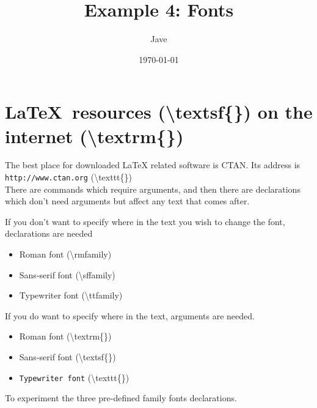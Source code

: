 \documentclass[letterpaper, 12pt]{article}
\begin{document}
\newcommand{\textttEx}{\textbackslash{}texttt\{\}}
\newcommand{\textsfEx}{\textbackslash{}textsf\{\}}
\newcommand{\textrmEx}{\textbackslash{}textrm\{\}}

\newcommand{\rmfamilyEx}{\textbackslash{}rmfamily}
\newcommand{\sffamilyEx}{\textbackslash{}sffamily}
\newcommand{\ttfamilyEx}{\textbackslash{}ttfamily}

\newcommand{\emEx}{\textbackslash{}em}


\newcommand{\mylipsum}{}
\title{Example 4: Fonts}
\date{\today}
\author{Jave}
\maketitle

\section{\textsf{\LaTeX\ resources (\textsfEx) \textrm{on the internet (\textrmEx)} } }

The best place for downloaded LaTeX related software is CTAN\@.
Its address is \texttt{http://www.ctan.org} (\textttEx)\\


There are commands which require arguments, and then there are declarations which 
don't need arguments but affect any text that comes after.


If you don't want to specify where in the text you wish to change the font, declarations are needed
\begin{itemize}
  \item \rmfamily Roman font (\rmfamilyEx)
  \item \sffamily Sans-serif font (\sffamilyEx)
  \item \ttfamily Typewriter font (\ttfamilyEx)
\end{itemize}

If you do want to specify where in the text, arguments are needed. 
\begin{itemize}
  \item \textrm{Roman font} (\textrmEx)
  \item \textsf{Sans-serif font} (\textsfEx)
  \item \texttt{Typewriter font} (\textttEx)
\end{itemize}

\noindent To experiment the three pre-defined family fonts declarations.
\end{document}
